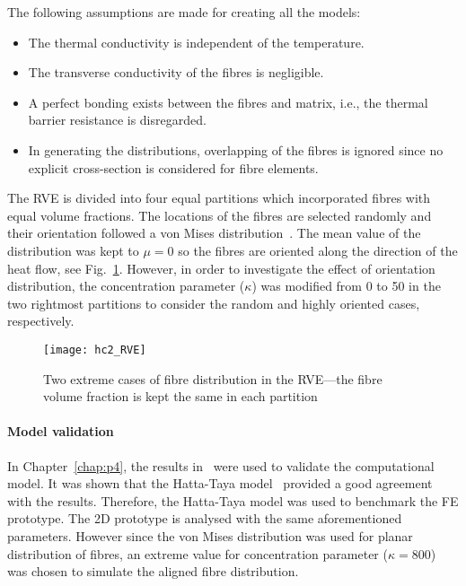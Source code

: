 	The following assumptions are made for creating all the models:
	\begin{itemize}
		\item The thermal conductivity is independent of the temperature.
		\item The transverse conductivity of the fibres is negligible.
		\item A perfect bonding exists between the fibres and matrix, i.e., the thermal barrier resistance is disregarded.
		\item In generating the distributions, overlapping of the fibres is ignored since no explicit cross-section is considered for fibre elements.
	\end{itemize}
	The RVE is divided into four equal partitions which incorporated fibres with equal volume fractions. The locations of the fibres are selected randomly and their orientation followed a von Mises distribution~\autocite{Mardia.1975}. The mean value of the distribution was kept to $\mu=0$ so the fibres are oriented along the direction of the heat flow, see Fig.~\ref{fig:case5}. However, in order to investigate the effect of orientation distribution, the concentration parameter ($\kappa$) was modified from 0 to 50 in the two rightmost partitions to consider the random and highly oriented cases, respectively. 
\begin{figure}[!h]
\centering
\texttt{[image: hc2\_RVE]}
\caption{Two extreme cases of fibre distribution in the RVE---the fibre volume fraction is kept the same in each partition}\label{fig:case5}
\end{figure}%

\red
	\paragraph{Model validation} In Chapter~\ref{chap:p4}, the results in~\autocite{Fu.2003,Choy.1994} were used to validate the computational model. It was shown that the Hatta-Taya model~\autocite{Hatta.1986,Taya.1989} provided a good agreement with the results. Therefore, the Hatta-Taya model was used to benchmark the FE prototype. The 2D prototype is analysed with the same aforementioned parameters. However since the von Mises distribution was used for planar distribution of fibres, an extreme value for concentration parameter ($\kappa=800$) was chosen to simulate the aligned fibre distribution. 
		

